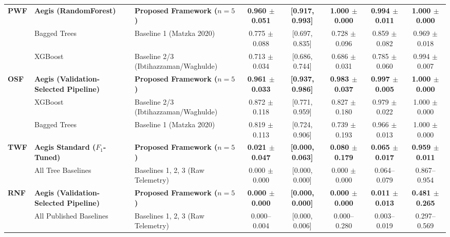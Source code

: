 \documentclass[conference]{IEEEtran}
\begin{document}
\begin{table}[t]
\begin{tabular}{lllccccc}
\midrule
\multirow{3}{*}{\textbf{PWF}} & \textbf{Aegis (RandomForest)} & \textbf{Proposed Framework ($n=5$)} & \textbf{0.960 $\pm$ 0.051} & \textbf{[0.917, 0.993]} & \textbf{1.000 $\pm$ 0.000} & \textbf{0.994 $\pm$ 0.011} & \textbf{1.000 $\pm$ 0.000} \\
 & Bagged Trees & Baseline 1 (Matzka 2020) & 0.775 $\pm$ 0.088 & [0.697, 0.835] & 0.728 $\pm$ 0.096 & 0.859 $\pm$ 0.082 & 0.969 $\pm$ 0.018 \\
 & XGBoost & Baseline 2/3 (Ibtihazzaman/Waghulde) & 0.713 $\pm$ 0.034 & [0.686, 0.744] & 0.686 $\pm$ 0.031 & 0.785 $\pm$ 0.060 & 0.994 $\pm$ 0.007 \\
\midrule
\multirow{3}{*}{\textbf{OSF}} & \textbf{Aegis (Validation-Selected Pipeline)} & \textbf{Proposed Framework ($n=5$)} & \textbf{0.961 $\pm$ 0.033} & \textbf{[0.937, 0.986]} & \textbf{0.983 $\pm$ 0.037} & \textbf{0.997 $\pm$ 0.005} & \textbf{1.000 $\pm$ 0.000} \\
 & XGBoost & Baseline 2/3 (Ibtihazzaman/Waghulde) & 0.872 $\pm$ 0.118 & [0.771, 0.959] & 0.827 $\pm$ 0.180 & 0.979 $\pm$ 0.022 & 1.000 $\pm$ 0.000 \\
 & Bagged Trees & Baseline 1 (Matzka 2020) & 0.819 $\pm$ 0.113 & [0.724, 0.906] & 0.739 $\pm$ 0.193 & 0.966 $\pm$ 0.013 & 1.000 $\pm$ 0.000 \\
\midrule
\multirow{2}{*}{\textbf{TWF}} & \textbf{Aegis Standard ($F_1$-Tuned)} & \textbf{Proposed Framework ($n=5$)} & \textbf{0.021 $\pm$ 0.047} & \textbf{[0.000, 0.063]} & \textbf{0.080 $\pm$ 0.179} & \textbf{0.065 $\pm$ 0.017} & \textbf{0.959 $\pm$ 0.011} \\
 & All Tree Baselines & Baselines 1, 2, 3 (Raw Telemetry) & 0.000 $\pm$ 0.000 & [0.000, 0.000] & 0.000 $\pm$ 0.000 & 0.064--0.079 & 0.867--0.954 \\
\midrule
\multirow{2}{*}{\textbf{RNF}} & \textbf{Aegis (Validation-Selected Pipeline)} & \textbf{Proposed Framework ($n=5$)} & \textbf{0.000 $\pm$ 0.000} & \textbf{[0.000, 0.000]} & \textbf{0.000 $\pm$ 0.000} & \textbf{0.011 $\pm$ 0.013} & \textbf{0.481 $\pm$ 0.265} \\
 & All Published Baselines & Baselines 1, 2, 3 (Raw Telemetry) & 0.000--0.004 & [0.000, 0.006] & 0.000--0.280 & 0.003--0.019 & 0.297--0.569 \\
\bottomrule
\end{tabular}
\label{tab:main_benchmark}
\end{table}
\end{document}
